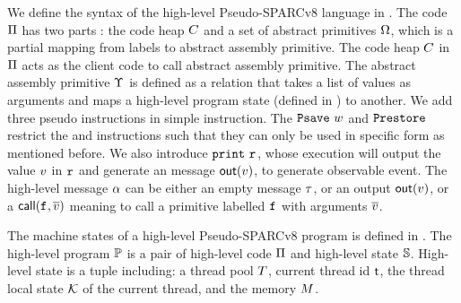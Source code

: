 We define the syntax of the high-level Pseudo-SPARCv8 language 
in \Fig{\ref{fig:syntax-of-concur-pseudo-sparc}}. 
The code $\Pi$ has two parts : 
the code heap $C$ 
and a set of abstract primitives $\Omega$, 
which is a partial mapping from labels to 
abstract assembly primitive. The code heap $C$ in $\Pi$ 
acts as the client code to 
call abstract assembly primitive. 
The abstract assembly primitive $\Upsilon$ 
is defined as a relation that takes a list of values 
as arguments and maps a high-level program state 
(defined in \Fig{\ref{fig:machine-state-concur-pseudo-sparc}}) 
to another. 
We add three pseudo instructions in simple instruction. 
The $\texttt{Psave} \ w$ 
and $\texttt{Prestore}$ restrict the \csave{} and \crestore{}
instructions such that they can only be used in specific form as 
mentioned before.  
We also introduce $\cprint \ \reg{}$, 
whose execution will output the value $v$ in $\texttt{r}_{}$ and 
generate an message $\textsf{out}({v})$, 
to generate observable event. 
The high-level message 
$\alpha$ can be either an empty message $\tau$, or an output 
$\textsf{out}({v})$, or a $\textsf{call}({\texttt{f}_{}, \overline{v}})$ meaning to 
call a primitive labelled $\texttt{f}_{}$ with arguments $\overline{v}$. 

The machine states of a high-level Pseudo-SPARCv8 program 
is defined in \Fig{\ref{fig:machine-state-concur-pseudo-sparc}}. 
The high-level program $\mathbb{P}$ is a pair of high-level code 
$\Pi$ and high-level state $\mathbb{S}$. High-level 
state is a tuple including: a thread pool $T$, 
current thread id $\textsf{t}$, the thread local state 
$\mathcal{K}$ of the current thread, and the memory $M$.

